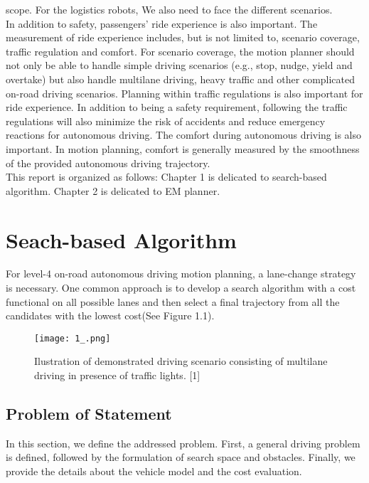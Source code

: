 \documentclass{thesisreport}
\begin{document}
 scope. For the logistics robots, We also need to face the different scenarios.\\
 \indent
 In addition to safety, passengers’ ride experience is also important. The measurement of ride experience includes, but is not limited to, scenario coverage, traffic regulation and comfort. For scenario coverage, the motion planner should not only be able to handle simple driving scenarios (e.g., stop, nudge, yield and overtake) but also handle multilane driving, heavy traffic and other complicated on-road driving scenarios.
 Planning within traffic regulations is also important for ride experience. In addition to being a safety requirement, following the traffic regulations will also minimize the risk of accidents and reduce emergency reactions for autonomous driving. The comfort during autonomous driving is also important. In motion planning, comfort is generally measured by the smoothness of the provided autonomous driving trajectory.\\
 \indent
 This report is organized as follows: Chapter 1 is delicated to search-based algorithm. Chapter 2 is delicated to EM planner.
 
 
 \chapter{Seach-based Algorithm}
 For level-4 on-road autonomous driving motion planning, a lane-change strategy is necessary. One common approach is to develop a search algorithm with a cost functional on all possible lanes and then
 select a final trajectory from all the candidates with the lowest cost(See Figure 1.1).
 \begin{figure}[ht]
 	\centering
 	\texttt{[image: 1\_.png]}
 	\caption{Ilustration of demonstrated driving scenario consisting of multilane driving in presence of traffic lights. [1]}
 	\label{fig:1.1} 
 \end{figure}
 \section{Problem of Statement}
 In this section, we define the addressed problem. First, a general driving problem is defined, followed by the formulation of search space and obstacles. Finally, we provide the details about the vehicle model and the cost evaluation.
\end{document}
